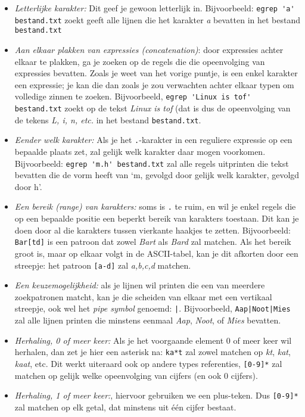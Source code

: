 \documentclass[a4paper,twoside,openany]{memoir}
\begin{document}
\begin{itemize}
\item \emph{Letterlijke karakter:} Dit geef je gewoon letterlijk in.  Bijvoorbeeld: \verb!egrep 'a' bestand.txt! zoekt geeft alle lijnen die het karakter \emph{a} bevatten in het bestand \verb!bestand.txt!
\item \emph{Aan elkaar plakken van expressies (concatenation)}: door expressies achter elkaar te plakken, ga je zoeken op de regels die die opeenvolging van expressies bevatten. Zoals je weet van het vorige puntje, is een enkel karakter een expressie; je kan die dan zoals je zou verwachten achter elkaar typen om volledige zinnen te zoeken. Bijvoorbeeld, \verb!egrep 'Linux is tof' bestand.txt! zoekt op de tekst \emph{Linux is tof} (dat is dus de opeenvolging van de tekens \emph{L, i, n, etc.} in het bestand \verb!bestand.txt!.
\item \emph{Eender welk karakter:} Als je het \verb!.!-karakter in een reguliere expressie op een bepaalde plaats zet, zal gelijk welk karakter daar mogen voorkomen. Bijvoorbeeld: \verb!egrep 'm.h' bestand.txt! zal alle regels uitprinten die tekst bevatten die de vorm heeft van `m, gevolgd door gelijk welk karakter, gevolgd door h'.
\item \emph{Een bereik (range) van karakters:} soms is \verb!.! te ruim, en wil je enkel regels die op een bepaalde positie een beperkt bereik van karakters toestaan. Dit kan je doen door al die karakters tussen vierkante haakjes te zetten. Bijvoorbeeld: \verb!Bar[td]! is een patroon dat zowel \emph{Bart} als \emph{Bard} zal matchen. Als het bereik groot is, maar op elkaar volgt in de ASCII-tabel, kan je dit afkorten door een streepje: het patroon \verb![a-d]! zal \emph{a,b,c,d} matchen.
\item \emph{Een keuzemogelijkheid:} als je lijnen wil printen die een van meerdere zoekpatronen matcht, kan je die scheiden van elkaar met een vertikaal streepje, ook wel het \emph{pipe symbol} genoemd: \verb!|!. Bijvoorbeeld, \verb!Aap|Noot|Mies! zal alle lijnen printen die minstens eenmaal \emph{Aap}, \emph{Noot}, of \emph{Mies} bevatten.
\item \emph{Herhaling, 0 of meer keer:} Als je het voorgaande element 0 of meer keer wil herhalen, dan zet je hier een asterisk na: \verb!ka*t! zal zowel matchen op \emph{kt}, \emph{kat}, \emph{kaat}, etc. Dit werkt uiteraard ook op andere types referenties, \verb![0-9]*! zal matchen op gelijk welke opeenvolging van cijfers (en ook 0 cijfers).
\item \emph{Herhaling, 1 of meer keer:}, hiervoor gebruiken we een plus-teken. Dus \verb![0-9]*! zal matchen op elk getal, dat minstens uit \'e\'en cijfer bestaat.

\end{itemize}
\end{document}
